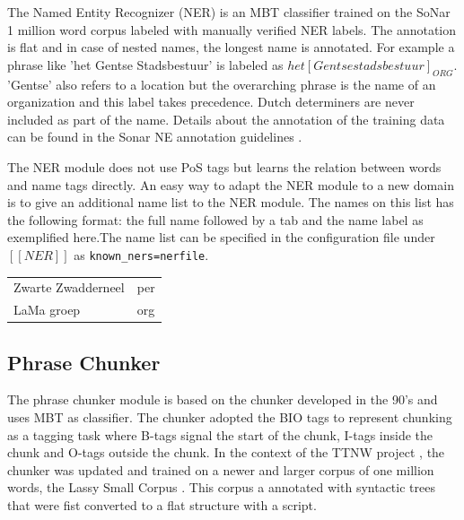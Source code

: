 \documentclass{book}
\begin{document}


The Named Entity Recognizer (NER) is an MBT classifier \cite{mbt} trained on the
SoNar 1 million word corpus labeled with manually verified NER labels.
The annotation is flat and in case of nested names, the longest name is annotated. For
example a phrase like 'het Gentse Stadsbestuur' is labeled as $het [Gentse stadsbestuur]_{ORG}$. 'Gentse' also refers to a location but the overarching phrase is the name of an organization and this label takes precedence. Dutch determiners are never included as part of the name.  Details about the annotation of the training data can be found in the Sonar NE annotation guidelines \cite{NERmanual}.

The NER module does not use PoS tags but learns the relation between words and
name tags directly.  An easy way to adapt the NER module to a new domain is to
give an additional name list to the NER module. The names on this list has the
following format: the full name followed by a tab and the name label as
exemplified here.The name list can be specified in the configuration file under $[[NER]]$ as {\tt known\_ners=nerfile}.\\

\begin{tabular}{ll}
Zwarte Zwadderneel &	per\\
LaMa groep	&	org\\
\end{tabular}




 \subsection{Phrase Chunker}

The phrase chunker module is based on the chunker developed in the 90's \cite{Daelem+1999} and uses MBT \cite{mbt} as classifier. The chunker adopted the BIO tags to represent chunking as a tagging task where B-tags signal the start of the chunk, I-tags inside the chunk and O-tags outside the chunk.
In the context of the TTNW project \cite{TTNWW}, the chunker was updated and trained on a newer and larger corpus of one million words, the Lassy Small Corpus \cite{lassy2011}. This corpus a annotated with syntactic trees that were fist converted to a flat structure with a script.
\end{document}
